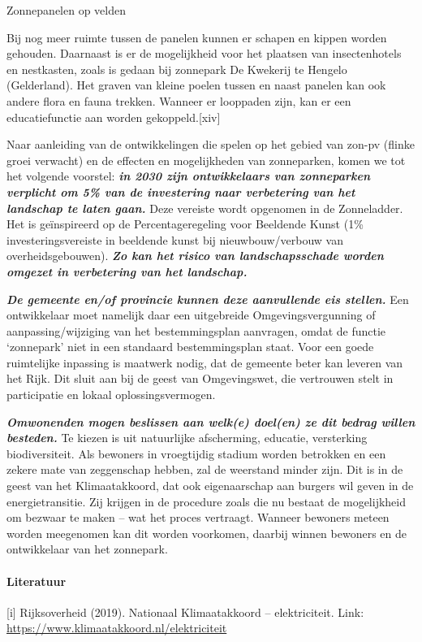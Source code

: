 \begin{voorstel}{Zonnepanelen op velden}
\begin{overwegingen}
Bij nog meer ruimte tussen de panelen kunnen er schapen en kippen worden gehouden. Daarnaast is er de mogelijkheid voor het plaatsen van insectenhotels en nestkasten, zoals is gedaan bij zonnepark De Kwekerij te Hengelo (Gelderland). Het graven van kleine poelen tussen en naast panelen kan ook andere flora en fauna trekken. Wanneer er looppaden zijn, kan er een educatiefunctie aan worden gekoppeld.[xiv]

\end{overwegingen}

\begin{aanbevelingen}
Naar aanleiding van de ontwikkelingen die spelen op het gebied van zon-pv (flinke groei verwacht) en de effecten en mogelijkheden van zonneparken, komen we tot het volgende voorstel: \textbf{\em{in 2030 zijn ontwikkelaars van zonneparken verplicht om 5\% van de investering naar verbetering van het landschap te laten gaan.}} Deze vereiste wordt opgenomen in de Zonneladder. Het is geïnspireerd op de Percentageregeling voor Beeldende Kunst (1\% investeringsvereiste in beeldende kunst bij nieuwbouw/verbouw van overheidsgebouwen). \textbf{\em{Zo kan het risico van landschapsschade worden omgezet in verbetering van het landschap.}}

\textbf{\em{De gemeente en/of provincie kunnen deze aanvullende eis stellen.}} Een ontwikkelaar moet namelijk daar een uitgebreide Omgevingsvergunning of aanpassing/wijziging van het bestemmingsplan aanvragen, omdat de functie ‘zonnepark’ niet in een standaard bestemmingsplan staat. Voor een goede ruimtelijke inpassing is maatwerk nodig, dat de gemeente beter kan leveren van het Rijk. Dit sluit aan bij de geest van Omgevingswet, die vertrouwen stelt in participatie en lokaal oplossingsvermogen.

\textbf{\em{Omwonenden mogen beslissen aan welk(e) doel(en) ze dit bedrag willen besteden.}} Te kiezen is uit natuurlijke afscherming, educatie, versterking biodiversiteit. Als bewoners in vroegtijdig stadium worden betrokken en een zekere mate van zeggenschap hebben, zal de weerstand minder zijn. Dit is in de geest van het Klimaatakkoord, dat ook eigenaarschap aan burgers wil geven in de energietransitie. Zij krijgen in de procedure zoals die nu bestaat de mogelijkheid om bezwaar te maken – wat het proces vertraagt. Wanneer bewoners meteen worden meegenomen kan dit worden voorkomen, daarbij winnen bewoners en de ontwikkelaar van het zonnepark.
\end{aanbevelingen}


\paragraph{Literatuur}
[i] Rijksoverheid (2019). Nationaal Klimaatakkoord – elektriciteit. Link: \url{https://www.klimaatakkoord.nl/elektriciteit}
 

\end{voorstel}
